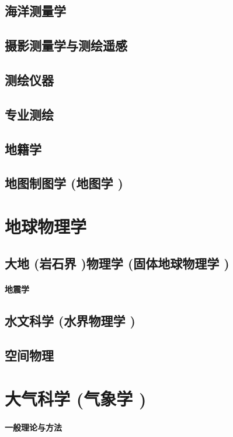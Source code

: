 \documentclass[UTF8]{../NatureUniverse}
\begin{document}
\section{海洋测量学}
\section{摄影测量学与测绘遥感}
\section{测绘仪器}
\section{专业测绘}
\section{地籍学}
\section{地图制图学 (地图学 )}






\chapter{地球物理学}
\section{大地 (岩石界 )物理学 (固体地球物理学 )}
    \subsubsection{地震学}
\section{水文科学 (水界物理学 )}
\section{空间物理}







\chapter{大气科学 (气象学 )}
\subsubsection{一般理论与方法}
\end{document}
